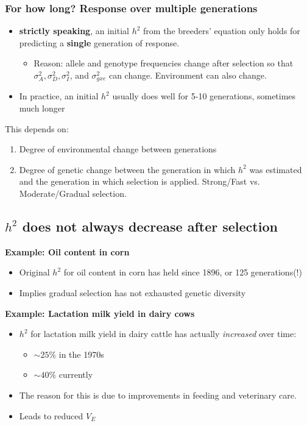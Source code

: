 \documentclass[10pt]{article}
\begin{document}
\subsubsection*{For how long?  Response over multiple generations}
\begin{itemize}
	\item \textbf{strictly speaking}, an initial $h^2$ from the breeders' equation only holds for predicting a \textbf{single} generation of response.
	\begin{itemize}
	    \item Reason: allele and genotype frequencies change after selection so that $\sigma_A^2, \sigma_D^2, \sigma_I^2$, and $\sigma_{gxe}^2$ can change.  Environment can also change.
    \end{itemize}
    \item In practice, an initial $h^2$ usually does well for 5-10 generations, sometimes much longer
\end{itemize}
This depends on:
\begin{enumerate}
	\item Degree of environmental change between generations
	\item Degree of genetic change between the generation in which $h^2$ was estimated and the generation in which selection is applied.  Strong/Fast vs. Moderate/Gradual selection.
\end{enumerate}

\subsection*{$h^2$ does not always decrease after selection}
\textbf{Example: Oil content in corn}
\begin{itemize}
	\item Original $h^2$ for oil content in corn has held since 1896, or 125 generations(!)
	\item Implies gradual selection has not exhausted genetic diversity
\end{itemize}
\textbf{Example: Lactation milk yield in dairy cows}
\begin{itemize}
	\item $h^2$ for lactation milk yield in dairy cattle has actually \textit{increased} over time:
	\begin{itemize}
	    \item $\sim 25\%$ in the 1970s
	    \item $\sim 40\%$ currently
    \end{itemize}
    \item The reason for this is due to improvements in feeding and veterinary care.
    \item Leads to reduced $V_E$
\end{itemize}
\end{document}
